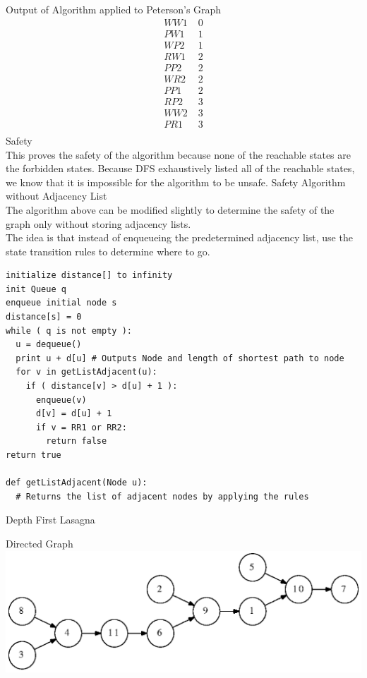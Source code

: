 \documentclass[12pt,twoside]{article}
\begin{document}
\begin{problems}
\begin{problemparts}
\problempart Output of Algorithm applied to Peterson's Graph \\
\begin{align*}
WW1 &\; 0\\
PW1 &\; 1\\
WP2 &\; 1\\
RW1 &\; 2\\
PP2 &\; 2\\
WR2 &\; 2\\
PP1 &\; 2\\
RP2 &\; 3\\
WW2 &\; 3\\
PR1 &\; 3\\
\end{align*}
\problempart Safety\\
This proves the safety of the algorithm because none of the reachable states are the forbidden states. Because DFS exhaustively listed all of the reachable states, we know that it is impossible for the algorithm to be unsafe.
\problempart Safety Algorithm without Adjacency List\\
The algorithm above can be modified slightly to determine the safety of the graph only without storing adjacency lists.  \\
The idea is that instead of enqueueing the predetermined adjacency list, use the state transition rules to determine where to go.\\
\begin{lstlisting}
initialize distance[] to infinity
init Queue q
enqueue initial node s
distance[s] = 0
while ( q is not empty ):
  u = dequeue()
  print u + d[u] # Outputs Node and length of shortest path to node
  for v in getListAdjacent(u):
    if ( distance[v] > d[u] + 1 ):
      enqueue(v)
      d[v] = d[u] + 1
      if v = RR1 or RR2:
        return false
return true

def getListAdjacent(Node u):
  # Returns the list of adjacent nodes by applying the rules
\end{lstlisting}

\end{problemparts}

\problem Depth First Lasagna\\
\begin{problemparts}
\problempart Directed Graph\\

\includegraphics{las.eps}


\end{problemparts}
\end{problems}
\end{document}
